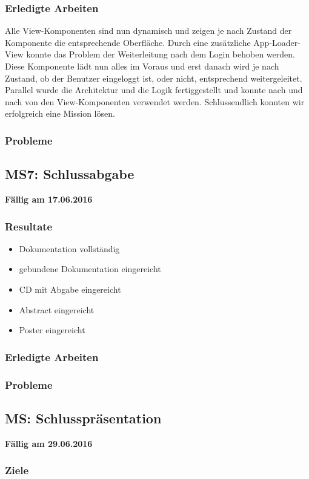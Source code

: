 \subsubsection{Erledigte Arbeiten}
Alle View-Komponenten sind nun dynamisch und zeigen je nach Zustand der Komponente die entsprechende Oberfläche.
Durch eine zusätzliche App-Loader-View konnte das Problem der Weiterleitung nach dem Login behoben werden.
Diese Komponente lädt nun alles im Voraus und erst danach wird je nach Zustand, ob der Benutzer eingeloggt ist, oder nicht, entsprechend weitergeleitet.
Parallel wurde die Architektur und die Logik fertiggestellt und konnte nach und nach von den View-Komponenten verwendet werden.
Schlussendlich konnten wir erfolgreich eine Mission lösen.

\subsubsection{Probleme}


\subsection{MS7: Schlussabgabe}
\label{pm-ms7}
\textbf{Fällig am 17.06.2016}
\subsubsection{Resultate}
\begin{itemize}
	\item Dokumentation vollständig
	\item gebundene Dokumentation eingereicht
	\item CD mit Abgabe eingereicht
	\item Abstract eingereicht
	\item Poster eingereicht
\end{itemize}

\subsubsection{Erledigte Arbeiten}


\subsubsection{Probleme}


\subsection{MS: Schlusspräsentation}
\label{pm-m8}
\textbf{Fällig am 29.06.2016}
\subsubsection{Ziele}
